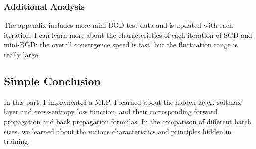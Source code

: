 \documentclass{article}
\begin{document}
\subsubsection{Additional Analysis}

The appendix includes more mini-BGD test data and is updated with each iteration. I can learn more about the characteristics of each iteration of SGD and mini-BGD: the overall convergence speed is fast, but the fluctuation range is really large.

\subsection{Simple Conclusion}

In this part, I implemented a MLP. I learned about the hidden layer, softmax layer and cross-entropy loss function, and their corresponding forward propagation and back propagation formulas. In the comparison of different batch sizes, we learned about the various characteristics and principles hidden in training.

\newpage
\end{document}

